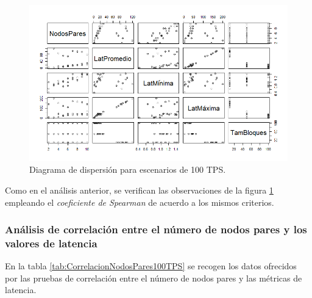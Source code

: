 \begin{figure}[h]
\centering
\includegraphics[scale=0.6]{Graphics/Rplot100TPS.png}
\caption{Diagrama de dispersi\'on para escenarios de 100 TPS.}
\label{Rplot100TPS}
\end{figure}

Como en el an\'alisis anterior, se verifican las observaciones de la figura \ref{Rplot100TPS} empleando el \emph{coeficiente de Spearman} de acuerdo a los mismos criterios.\\

\subsubsection{An\'alisis de correlaci\'on entre el n\'umero de nodos pares y los valores de latencia}
 En la tabla \ref{tab:CorrelacionNodosPares100TPS} se recogen los datos ofrecidos por las pruebas de correlaci\'on entre el n\'umero de nodos pares y las m\'etricas de latencia.\\
 
\begin{table}[h]
\centering
{}
\caption{Resultados de aplicar el \emph{coeficiente de correlaci\'on de Spearman} entre el n\'umero de nodos pares y las muestras de latencia en redes con un flujo de 100 TPS.}
\label{tab:CorrelacionNodosPares100TPS} 
\end{table} 

